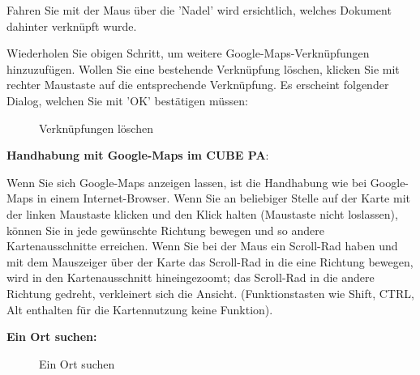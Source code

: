 Fahren Sie mit der Maus über die 'Nadel' wird ersichtlich, welches Dokument dahinter verknüpft wurde.

\vspace{3mm}

Wiederholen Sie obigen Schritt, um weitere Google-Maps-Verknüpfungen hinzuzufügen. Wollen Sie eine bestehende Verknüpfung löschen, klicken Sie mit rechter Maustaste auf die entsprechende Verknüpfung. Es erscheint folgender Dialog, welchen Sie mit 'OK' bestätigen müssen: 

\begin{figure}[H]
\caption{Verknüpfungen löschen}
\end{figure}


\textbf{Handhabung mit Google-Maps im CUBE PA}:

Wenn Sie sich Google-Maps anzeigen lassen, ist die Handhabung wie bei Google-Maps in einem Internet-Browser. Wenn Sie an beliebiger Stelle auf der Karte mit der linken Maustaste klicken und den Klick halten (Maustaste nicht loslassen), können Sie in jede gewünschte Richtung bewegen und so andere Kartenausschnitte erreichen. Wenn Sie bei der Maus ein Scroll-Rad haben und mit dem Mauszeiger über der Karte das Scroll-Rad in die eine Richtung bewegen, wird in den Kartenausschnitt hineingezoomt; das Scroll-Rad in die andere Richtung gedreht, verkleinert sich die Ansicht. (Funktionstasten wie Shift, CTRL, Alt enthalten für die Kartennutzung keine Funktion).

\vspace{\baselineskip}

\textbf{Ein Ort suchen:} 

\begin{figure}[H]
\caption{Ein Ort suchen}
\end{figure}

